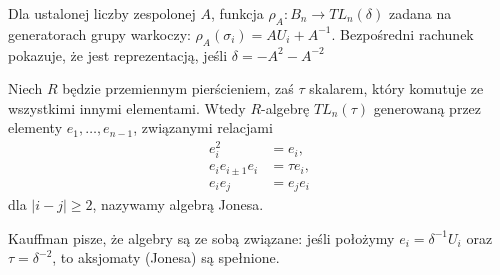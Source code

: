 \begin{comment}
            \strand[semithick] (-3, -2) to (3, -2);
            \strand[semithick] (-3, 0) [in=down, out=right] to (-1, 1) [in=right, out=up] to (-3, 2);
            \strand[semithick] (3, 0) [in=down, out=left] to (1, 1) [in=left, out=up] to (3, 2);
            \strand[semithick] (-3, +4) to (3, +4);
            \node[darkblue] at (0, -6) {$e_3$};
    \end{knot}
    \end{tikzpicture}
    \begin{tikzpicture}[baseline=-0.65ex, scale=0.2]
        \useasboundingbox (-6, -5) rectangle (6, 4);
        \begin{knot}[clip width=5, end tolerance=1pt]
            \strand[semithick] (-3, -4) to (3, -4);
            \strand[semithick] (-3, -2) to (3, -2);
            \strand[semithick] (-3, -0) to (3, +0);
            \strand[semithick] (-3, 2) [in=down, out=right] to (-1, 3) [in=right, out=up] to (-3, 4);
            \strand[semithick] (3, 2) [in=down, out=left] to (1, 3) [in=left, out=up] to (3, 4);
            \node[darkblue] at (0, -6) {$e_4$};
    \end{knot}
    \end{tikzpicture}
\]
\caption{Diagramatyczne przedstawienie elementów bazowych algebry $TL_5(\delta)$}
\end{figure}
\end{comment}

Dla ustalonej liczby zespolonej $A$, funkcja $\rho_A \colon B_n \to TL_n(\delta)$ zadana na generatorach grupy warkoczy: $\rho_A(\sigma_i) = AU_i + A^{-1}$.
Bezpośredni rachunek pokazuje, że jest reprezentacją, jeśli $\delta = -A^2-A^{-2}$

\begin{definition}
%
    Niech $R$ będzie przemiennym pierścieniem, zaś $\tau$ skalarem, który komutuje ze wszystkimi innymi elementami.
    Wtedy $R$-algebrę $TL_n(\tau)$ generowaną przez elementy $e_1, \ldots, e_{n-1}$, związanymi relacjami
    \begin{align}
        e_i^2 & = e_i, \\
        e_i e_{i \pm 1} e_i & = \tau e_i, \\
        e_i e_j & = e_j e_i
    \end{align}
    dla $|i-j| \ge 2$, nazywamy algebrą Jonesa.
\end{definition}

Kauffman pisze, że algebry są ze sobą związane: jeśli położymy $e_i = \delta^{-1} U_i$ oraz $\tau = \delta^{-2}$, to aksjomaty (Jonesa) są spełnione.

